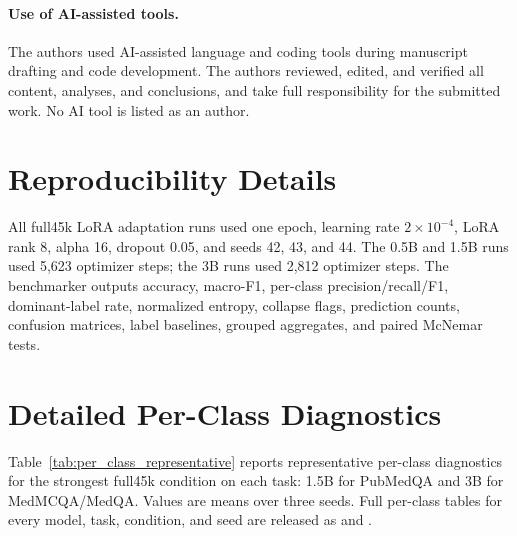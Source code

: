 \documentclass[11pt]{article}
\begin{document}
\paragraph{Use of AI-assisted tools.}
The authors used AI-assisted language and coding tools during manuscript drafting and code development. The authors reviewed, edited, and verified all content, analyses, and conclusions, and take full responsibility for the submitted work. No AI tool is listed as an author.




\appendix

\section{Reproducibility Details}

All full45k LoRA adaptation runs used one epoch, learning rate $2\times10^{-4}$, LoRA rank 8, alpha 16, dropout 0.05, and seeds 42, 43, and 44. The 0.5B and 1.5B runs used 5,623 optimizer steps; the 3B runs used 2,812 optimizer steps. The benchmarker outputs accuracy, macro-F1, per-class precision/recall/F1, dominant-label rate, normalized entropy, collapse flags, prediction counts, confusion matrices, label baselines, grouped aggregates, and paired McNemar tests.

\section{Detailed Per-Class Diagnostics}

Table~\ref{tab:per_class_representative} reports representative per-class diagnostics for the strongest full45k condition on each task: 1.5B for PubMedQA and 3B for MedMCQA/MedQA. Values are means over three seeds. Full per-class tables for every model, task, condition, and seed are released as  and .
\end{document}
